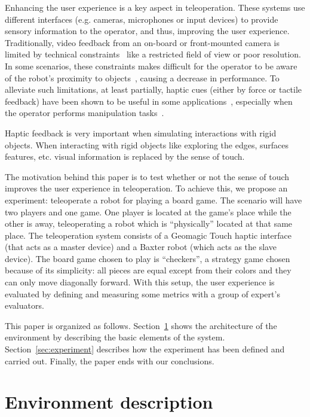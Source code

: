 \documentclass[journal,twoside]{JoPhA}
\begin{document}
  Enhancing the user experience is a key aspect in teleoperation. These systems use different interfaces (e.g. cameras, microphones or input devices) to provide sensory information to the operator, and thus, improving the user experience. Traditionally, video feedback from an on-board or front-mounted camera is limited by technical constraints~\cite{Woods04,Woods97} like a restricted field of view or poor resolution. In some scenarios, these constraints makes difficult for the operator to be aware of the robot's proximity to objects~\cite{Alfano90}, causing a decrease in performance. To alleviate such limitations, at least partially, haptic cues (either by force or tactile feedback) have been shown to be useful in some applications~\cite{Son13,Sitti03,Diolaiti02}, especially when the operator performs manipulation tasks~\cite{King09,Kron04}.
  
  Haptic feedback is very important when simulating interactions with rigid objects. When interacting with rigid objects like exploring the edges, surfaces features, etc. visual information is replaced by the sense of touch.  %

  The motivation behind this paper is to test whether or not the sense of touch improves the user experience in teleoperation. To achieve this, we propose an experiment: teleoperate a robot for playing a board game. The scenario will have two players and one game. One player is located at the game's place while the other is away, teleoperating a robot which is ``physically'' located at that same place. The teleoperation system consists of a Geomagic Touch haptic interface (that acts as a master device) and a Baxter robot (which acts as the slave device). The board game chosen to play is ``checkers'', a strategy game chosen because of its simplicity: all pieces are equal except from their colors and they can only move diagonally forward. With this setup, the user experience is evaluated by defining and measuring some metrics with a group of expert's evaluators.

  This paper is organized as follows. Section~\ref{sec:environment} shows the architecture of the environment by describing the basic elements of the system. Section~\ref{sec:experiment} describes how the experiment has been defined and carried out. Finally, the paper ends with our conclusions.

\section{Environment description}
\label{sec:environment}
\end{document}
